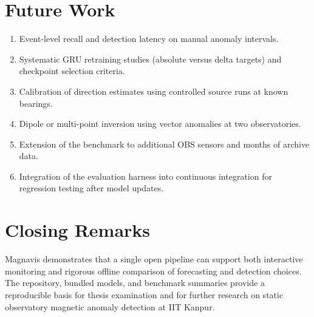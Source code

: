 \section{Future Work}
\begin{enumerate}[label=(\alph*)]
    \item Event-level recall and detection latency on manual anomaly intervals.
    \item Systematic GRU retraining studies (absolute versus delta targets) and checkpoint selection criteria.
    \item Calibration of direction estimates using controlled source runs at known bearings.
    \item Dipole or multi-point inversion using vector anomalies at two observatories.
    \item Extension of the benchmark to additional OBS sensors and months of archive data.
    \item Integration of the evaluation harness into continuous integration for regression testing after model updates.
\end{enumerate}

\section{Closing Remarks}
Magnavis demonstrates that a single open pipeline can support both interactive monitoring and rigorous offline comparison of forecasting and detection choices. The repository, bundled models, and benchmark summaries provide a reproducible basis for thesis examination and for further research on static observatory magnetic anomaly detection at IIT Kanpur.
